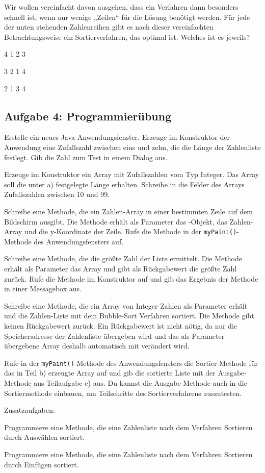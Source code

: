 Wir wollen vereinfacht davon ausgehen, dass ein Verfahren dann besonders
schnell ist, wenn nur wenige „Zeilen“ für die Lösung benötigt werden. Für jede
der unten stehenden Zahlenreihen gibt es nach dieser vereinfachten
Betrachtungsweise ein Sortierverfahren, das optimal ist. Welches ist es jeweils?

\begin{compactenum}[a)]
\item 4  1  2  3
\item 3  2  1  4
\item 2  1  3  4
\end{compactenum}


\subsection{Aufgabe 4: Programmierübung}

\begin{compactenum}[a)]
\item Erstelle ein neues Java-Anwendungsfenster. Erzeuge im Konstruktor der
Anwendung eine Zufallszahl zwischen eins und zehn, die die Länge der
Zahlenliste festlegt. Gib die Zahl zum Test in einem Dialog aus.

\item Erzeuge im Konstruktor ein Array mit Zufallszahlen vom Typ Integer. Das
Array soll die unter a) festgelegte Länge erhalten. Schreibe in die Felder des
Arrays Zufallszahlen zwischen 10 und 99.

\item Schreibe eine Methode, die ein Zahlen-Array in einer bestimmten Zeile auf
dem Bildschirm ausgibt. Die Methode erhält als Parameter das
-Objekt, das Zahlen-Array und die y-Koordinate der Zeile.
Rufe die Methode in der \lstinline|myPaint()|-Methode des Anwendungsfensters
auf.

\item Schreibe eine Methode, die die größte Zahl der Liste ermittelt. Die
Methode erhält als Parameter das Array und gibt als Rückgabewert die größte
Zahl zurück. Rufe die Methode im Konstruktor auf und gib das Ergebnis der
Methode in einer Messagebox aus.

\item Schreibe eine Methode, die ein Array von Integer-Zahlen als Parameter
erhält und die Zahlen-Liste mit dem Bubble-Sort Verfahren sortiert. Die Methode
gibt keinen Rückgabewert zurück. Ein Rückgabewert ist nicht nötig, da nur die
Speicheradresse der Zahlenliste übergeben wird und das als Parameter übergebene
Array deshalb automatisch mit verändert wird.

Rufe in der \lstinline|myPaint()|-Methode des Anwendungsfensters die
Sortier-Methode für das in Teil b) erzeugte Array auf und gib die sortierte
Liste mit der Ausgabe-Methode aus Teilaufgabe c) aus. Du kannst die
Ausgabe-Methode auch in die Sortiermethode einbauen, um Teilschritte 
des Sortierverfahrens auszutesten.
\end{compactenum}

Zusatzaufgaben:

\begin{compactenum}[a)]
\setcounter{enumi}{5}
\item Programmiere eine Methode, die eine Zahlenliste nach dem Verfahren
Sortieren durch Auswählen sortiert.

\item Programmiere eine Methode, die eine Zahlenliste nach dem Verfahren
Sortieren durch Einfügen sortiert.
\end{compactenum}
